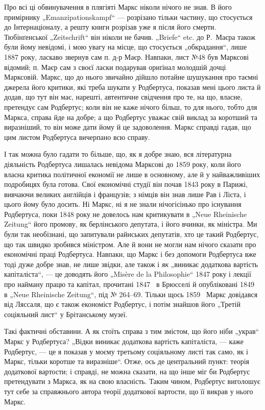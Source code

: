 Про всі ці обвинувачення в плягіяті Маркс ніколи нічого не знав.
В його примірнику „Emanzipationskampf“ — розрізано тільки частину,
що стосується до Інтернаціоналу, а решту книги розрізав уже я після
його смерти. Тюбінґенської „Zeitschrift“ він ніколи не бачив. „Briefe“ etc.
до Р.~Маєра також були йому невідомі, і мою увагу на місце, що стосується
„обкрадання“, лише 1887 року, ласкаво звернув сам п. д-р Маєр.
Навпаки, лист №48 був Марксові відомий; п. Маєр сам з своєї ласки
подарував ориґінал молодшій дочці Марксовій. Маркс, що до нього звичайно
дійшло потайне шушукання про таємні джерела його критики, які
треба шукати у Родбертуса, показав мені цього листа й додав, що тут
він має, нарешті, автентичне свідчення про те, на що, власне, претендує
сам Родбертус; коли він не каже нічого більш, то для нього, тобто для
Маркса, справа йде на добре; а що Родбертус уважає свій виклад за
коротший та виразніший, то він може дати йому й це задоволення.
Маркс справді гадав, що цим листом Родбертуса вичерпано всю справу.

І так можна було гадати то більше, що, як я добре знаю, вся літературна
діяльність Родбертуса лишалась невідома Марксові до 1859 року,
коли його власна критика політичної економії не лише в основному, але
й у найважливіших подробицях була готова. Свої економічні студії він
почав 1843 року в Парижі, вивчаючи великих англійців і французів; з
німців він знав лише Рав і Ліста, і цього йому було досить. Ні Маркс,
ні я не знали нічогісінько про існування Родбертуса, поки 1848 року
не довелось нам критикувати в „Neue Rheinische Zeitung“ його промову,
як берлінського депутата, і його вчинки, як міністра. Ми були так необізнані,
що запитували райнських депутатів, хто це такий Родбертус,
що так швидко зробився міністром. Але й вони не могли нам нічого
сказати про економічні праці Родбертуса. Навпаки, що Маркс і без допомоги
Родбертуса вже тоді дуже добре знав, не лише звідки, але також
і \emph{як} „виникає додаткова вартість капіталіста“, — це доводять його
„Misère de la Philosophie“ 1847 року і лекції про найману працю та капітал,
прочитані 1847~ в Брюсселі й опубліковані 1849~ в „Neue
Rheinische Zeitung“, під № 264--69. Тільки щось 1859~ Маркс довідався
від Ляссаля, що є також економіст Родбертус, і потім знайшов
його „Третій соціяльний лист“ у Брітанському музеї.

Такі фактичні обставини. А як стоїть справа з тим змістом, що його
ніби „украв“ Маркс у Родбертуса? „Відки виникає додаткова вартість
капіталіста, — каже Родбертус, — це я показав у моєму третьому соціяльному
листі так само, як і Маркс, тільки коротше та виразніше“. Отже,
ось де центральний пункт: теорія додаткової вартости; і справді, не
можна сказати, на що інше міг би Родбертус претендувати з Маркса,
як на свою власність. Таким чином, Родбертус виголошує тут себе за
справжнього автора теорії додаткової вартости, що її викрав у нього Маркс.

